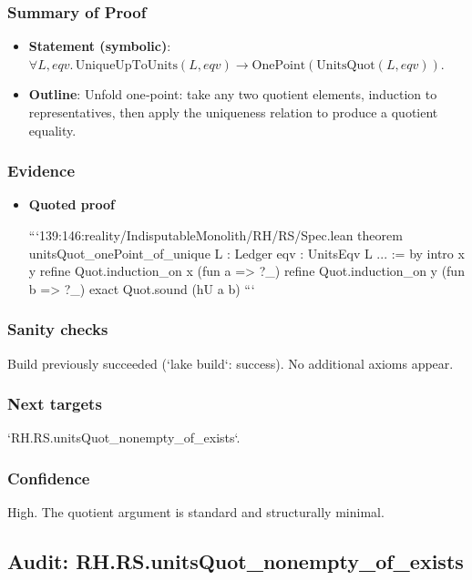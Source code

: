 \documentclass{article}
\begin{document}
\subsubsection{Summary of Proof}
\begin{itemize}[leftmargin=*]
  \item \textbf{Statement (symbolic)}: \(\forall L,eqv.\, \mathrm{UniqueUpToUnits}(L,eqv) \to \mathrm{OnePoint}(\mathrm{UnitsQuot}(L,eqv))\).
  \item \textbf{Outline}: Unfold one‑point: take any two quotient elements, induction to representatives, then apply the uniqueness relation to produce a quotient equality.
\end{itemize}

\subsubsection{Evidence}
\begin{itemize}[leftmargin=*]
  \item \textbf{Quoted proof}

```139:146:reality/IndisputableMonolith/RH/RS/Spec.lean
theorem unitsQuot_onePoint_of_unique {L : Ledger} {eqv : UnitsEqv L} ... := by
  intro x y
  refine Quot.induction_on x (fun a => ?_)
  refine Quot.induction_on y (fun b => ?_)
  exact Quot.sound (hU a b)
```
\end{itemize}

\subsubsection{Sanity checks}
Build previously succeeded (`lake build`: success). No additional axioms appear.

\subsubsection{Next targets}
`RH.RS.unitsQuot_nonempty_of_exists`.

\subsubsection{Confidence}
High. The quotient argument is standard and structurally minimal.

\subsection{Audit: RH.RS.unitsQuot\_nonempty\_of\_exists}
\end{document}
